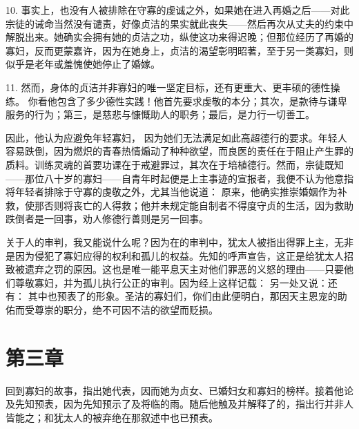 10. 事实上，也没有人被排除在守寡的虔诚之外，如果她在进入再婚之后——对此宗徒的诫命当然没有谴责，好像贞洁的果实就此丧失——然后再次从丈夫的约束中解脱出来。她确实会拥有她的贞洁之功，纵使这功来得迟晚；但那位经历了再婚的寡妇，反而更蒙嘉许，因为在她身上，贞洁的渴望彰明昭著，至于另一类寡妇，则似乎是老年或羞愧使她停止了婚嫁。\par

11. 然而，身体的贞洁并非寡妇的唯一坚定目标，还有更重大、更丰硕的德性操练。 你看他包含了多少德性实践！他首先要求虔敬的本分；其次，是款待与谦卑服务的行为；第三，是慈悲与慷慨助人的职务；最后，是力行一切善工。\par

因此，他认为应避免年轻寡妇， 因为她们无法满足如此高超德行的要求。年轻人容易跌倒，因为燃炽的青春热情煽动了种种欲望，而良医的责任在于阻止产生罪的质料。训练灵魂的首要功课在于戒避罪过，其次在于培植德行。然而，宗徒既知——那位八十岁的寡妇——自青年时起便是上主事迹的宣报者，我便不认为他意指将年轻者排除于守寡的虔敬之外，尤其当他说道： 原来，他确实推崇婚姻作为补救，使那否则将丧亡的人得救；他并未规定能自制者不得度守贞的生活，因为救助跌倒者是一回事，劝人修德行善则是另一回事。\par

关于人的审判，我又能说什么呢？因为在的审判中，犹太人被指出得罪上主，无非是因为侵犯了寡妇应得的权利和孤儿的权益。先知的呼声宣告，这正是给犹太人招致被遗弃之罚的原因。这也是唯一能平息天主对他们罪恶的义怒的理由——只要他们尊敬寡妇，并为孤儿执行公正的审判。因为经上这样记载： 另一处又说：还有： 其中也预表了的形象。圣洁的寡妇们，你们由此便明白，那因天主恩宠的助佑而受尊崇的职分，绝不可因不洁的欲望而贬损。\par


\section{第三章}

回到寡妇的故事，指出她代表，因而她为贞女、已婚妇女和寡妇的榜样。接着他论及先知预表，因为先知预示了及将临的雨。随后他触及并解释了的，指出行并非人皆能之；和犹太人的被弃绝在那叙述中也已预表。\par

